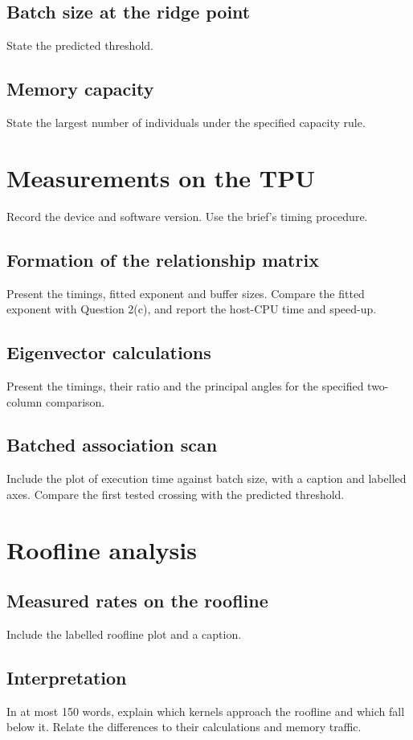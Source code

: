 \documentclass[11pt,a4paper]{article}
\begin{document}
\subsection{Batch size at the ridge point}
State the predicted threshold.

\subsection{Memory capacity}
State the largest number of individuals under the specified capacity rule.

\section{Measurements on the TPU}
Record the device and software version. Use the brief's timing procedure.

\subsection{Formation of the relationship matrix}
Present the timings, fitted exponent and buffer sizes. Compare the fitted
exponent with Question 2(c), and report the host-CPU time and speed-up.

\subsection{Eigenvector calculations}
Present the timings, their ratio and the principal angles for the specified
two-column comparison.

\subsection{Batched association scan}
Include the plot of execution time against batch size, with a caption and
labelled axes. Compare the first tested crossing with the predicted threshold.

\section{Roofline analysis}
\subsection{Measured rates on the roofline}
Include the labelled roofline plot and a caption.

\subsection{Interpretation}
In at most 150 words, explain which kernels approach the roofline and which
fall below it. Relate the differences to their calculations and memory traffic.
\end{document}
